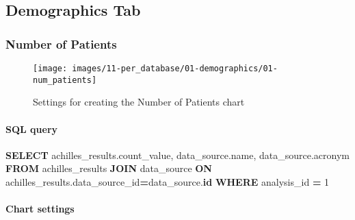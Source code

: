 \documentclass[
]{book}
\newenvironment{Shaded}{\begin{snugshade}}{\end{snugshade}}
\newcommand{\DecValTok}[1]{\textcolor[rgb]{0.00,0.00,0.81}{#1}}
\newcommand{\KeywordTok}[1]{\textcolor[rgb]{0.13,0.29,0.53}{\textbf{#1}}}
\newcommand{\NormalTok}[1]{#1}
\newcommand{\OperatorTok}[1]{\textcolor[rgb]{0.81,0.36,0.00}{\textbf{#1}}}
\begin{document}
\hypertarget{demographics-tab}{%
\subsection*{Demographics Tab}\label{demographics-tab}}

\hypertarget{number-of-patients}{%
\subsubsection*{Number of Patients}\label{number-of-patients}}

\begin{figure}
\texttt{[image: images/11-per\_database/01-demographics/01-num\_patients]} \caption{Settings for creating the Number of Patients chart}\label{fig:numPatients}
\end{figure}

\hypertarget{sql-query-28}{%
\paragraph*{SQL query}\label{sql-query-28}}

\begin{Shaded}
\begin{Highlighting}[]
\KeywordTok{SELECT}
\NormalTok{  achilles\_results.count\_value,}
\NormalTok{  data\_source.name,}
\NormalTok{  data\_source.acronym}
\KeywordTok{FROM}\NormalTok{ achilles\_results}
\KeywordTok{JOIN}\NormalTok{ data\_source }\KeywordTok{ON}\NormalTok{ achilles\_results.data\_source\_id}\OperatorTok{=}\NormalTok{data\_source.}\KeywordTok{id}
\KeywordTok{WHERE}\NormalTok{ analysis\_id }\OperatorTok{=} \DecValTok{1}
\end{Highlighting}
\end{Shaded}

\hypertarget{chart-settings-30}{%
\paragraph*{Chart settings}\label{chart-settings-30}}
\end{document}
